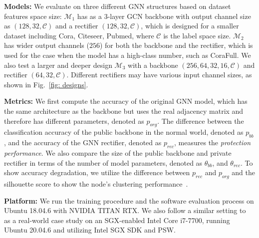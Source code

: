 \noindent\textbf{Models:}
We evaluate \mymethod on three different GNN structures based on dataset features space size:
$\mathcal{M}_1$ has as a 3-layer GCN backbone with output channel size as $(128, 32, \mathcal{C})$ and a rectifier $(128, 32, \mathcal{C})$, which is designed for a smaller dataset including Cora, Citeseer, Pubmed, where $\mathcal{C}$ is the label space size.
$\mathcal{M}_2$ has wider output channels ($256$) for both the backbone and the rectifier, which is used for the case when the model has a high-class number, such as CoraFull.
We also test a larger and deeper design $\mathcal{M}_3$ with a backbone $(256, 64, 32, 16, \mathcal{C})$ and rectifier $(64, 32, \mathcal{C})$. 
Different rectifiers may have various input channel sizes, as shown in Fig.~\ref{fig: designs}.

\noindent\textbf{Metrics:}
We first compute the accuracy of the original GNN model, which has the same architecture as the backbone but uses the real adjacency matrix and therefore has different parameters, denoted as $p_{org}$.
The difference between the classification accuracy of the public backbone in the normal world, denoted as $p_{bb}$, and the accuracy of the GNN rectifier, denoted as $p_{rec}$, measures the \textit{protection performance}. 
We also compare the size of the public backbone and private rectifier in terms of the number of model parameters, denoted as $\theta_{bb}$, and $\theta_{rec}$.
To show accuracy degradation, we utilize the difference between $p_{rec}$ and $p_{org}$ and the silhouette score to show the node's clustering performance~\cite{shahapure2020cluster}.

\noindent\textbf{Platform:}
We run the training procedure and the software evaluation process on Ubuntu 18.04.6 with NVIDIA TITAN RTX.
We also follow a similar setting to~\cite{zhang2024no} as a real-world case study on an SGX-enabled Intel Core i7-7700, running Ubuntu 20.04.6 and utilizing Intel SGX SDK and PSW.


